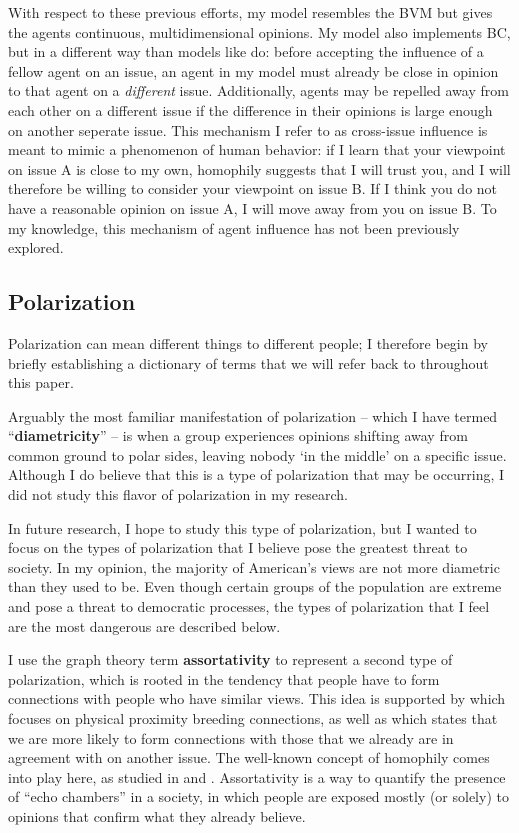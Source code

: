 With respect to these previous efforts, my model resembles the BVM but gives
the agents continuous, multidimensional opinions. My model also implements BC, but in
a different way than models like \cite{tsang_opinion_2014} do: before accepting
the influence of a fellow agent on an issue, an agent in my model must already
be close in opinion to that agent on a \textit{different} issue. Additionally, agents may be repelled away from each other on a different issue if the difference in their opinions is large enough on another seperate issue. This mechanism I refer to as  
cross-issue influence is meant to mimic a phenomenon of human behavior: if I learn that your viewpoint on
issue A is close to my own, homophily suggests that I will trust you, and I
will therefore be willing to consider your viewpoint on issue B. If I think you do not have a reasonable opinion on issue A, I will move away from you on issue B. To my
knowledge, this mechanism of agent influence has not been previously explored.

\subsection{Polarization}

Polarization can mean different things to different people; I therefore begin
by briefly establishing a dictionary of terms that we will refer back to
throughout this paper.

Arguably the most familiar manifestation of polarization -- which I have termed
``\textbf{diametricity}'' -- is when a group experiences opinions shifting away
from common ground to polar sides, leaving nobody `in the middle' on a specific
issue. Although I do believe that this is a type of polarization that may be occurring, I did not study this flavor of polarization in my research. 

In future research, I hope to study this type of polarization, but I wanted to focus on the types of polarization that I believe pose the greatest threat to society. In my opinion, the majority of American's views are not more diametric than they used to be. Even though certain groups of the population are extreme and pose a threat to democratic processes, the types of polarization that I feel are the most dangerous are described below. 

I use the graph theory term \textbf{assortativity} to represent a second type
of polarization, which is rooted in the tendency that people have to form
connections with people who have similar views. This idea is supported by
\cite{klinkner_red_2005} which focuses on physical proximity breeding
connections, as well as \cite{cholvy_diffusion_2016} which states that we are
more likely to form connections with those that we already are in agreement
with on another issue. The well-known concept of homophily comes into play
here, as studied in \cite{davies_twin_2017} and \cite{taylor_exploring_2018}.
Assortativity is a way to quantify the presence of ``echo chambers'' in a
society, in which people are exposed mostly (or solely) to opinions that
confirm what they already
believe.\cite{dandekar_biased_2013,flaxman_filter_2016}

